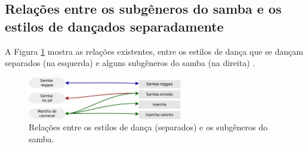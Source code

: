 \subsection{Relações entre os subgêneros do samba e os estilos de dançados separadamente}

A Figura \ref{fig:sambadavavsmusicaseparado} mostra as relações existentes, 
entre os estilos de dança que se dançam separados (na esquerda) 
e alguns subgêneros do samba (na direita)  \cite[pp. 134-138]{perna2002samba}.

\begin{figure}[h]
  \centering
    \includegraphics[width=0.6\textwidth]{chapters/cap-historia-dancasamba/dancavcmusicaseparado.eps}
  \caption{Relações entre os estilos de dança (separados) e os subgêneros do samba.}
\label{fig:sambadavavsmusicaseparado}
\end{figure}
